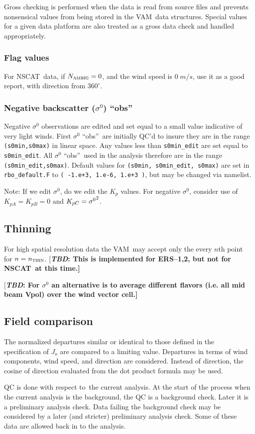 \documentclass[11pt]{article}
\newcommand{\computer}[1]{{\tt #1}}
\newcommand{\degrees}[1]{\mbox{$ {#1}^\circ $}}
\newcommand{\ers}[1]{ERS--{#1}}
\newcommand{\J}[1]{\mbox{$ J_{#1} $}}
\newcommand{\K}[1]{\mbox{$ K_{#1} $}}
\newcommand{\mks}[2]{\mbox{$ {#1} \; {#2} $}}
\newcommand{\nscat}{NSCAT}
\newcommand{\obs}{``obs''}
\newcommand{\s}[1]{\mbox{$ \sigma^{#1} $}}
\newcommand{\vam}{VAM}
\newcommand{\wrt}{with respect to}
\newcommand{\xxx}[1]{\subsection {#1}}
\newcommand{\xxxx}[1]{\subsubsection {#1}}
\newcommand{\TBD}[1]{{[\bfseries{\itshape{TBD: }{{#1}}}]}}
\newcommand{\COMMENT}[2]{{[\bfseries {\itshape #1}: {#2}]}}
\renewcommand{\TBD}[1]{\COMMENT{TBD}{{#1}}}
\newcommand{\subsc}[2]{\mbox{$ #1_{\mbox{\sc \footnotesize #2}} $}}
\begin{document}
Gross checking is performed when the data is read from source
files and prevents nonsensical values from being stored in the \vam\
data structures.  Special values for a given data platform are
also treated as a gross data check and handled appropriately.

\xxxx {Flag values}

For \nscat\ data, if $\subsc{N}{ambig} = 0$, and the wind speed is
\mks{0}{m/s}, use it as a good report, with direction from
\degrees{360}.

\xxxx {Negative backscatter (\s0) \obs}

Negative \s0 observations are edited and set equal to a small value
indicative of very light winds.  First \s0 \obs\ are initially QC'd to
insure they are in the range \computer{(s0min,s0max)} in linear space.
Any values less than \computer{s0min\_edit} are set equal to
\computer{s0min\_edit}.  All \s0 \obs\ used in the analysis therefore
are in the range \computer{(s0min\_edit,s0max)}.  Default values for
\computer{(s0min, s0min\_edit, s0max)} are set in
\computer{rbo\_default.F} to \computer{( -1.e+3, 1.e-6, 1.e+3 )}, but
may be changed via namelist.

Note: If we edit \s0, do we edit the \K{p} values.  For negative \s0,
consider use of $ K_{pA}=K_{pB}=0 $ and $ K_{pC} = \s0^2$.

\xxx {Thinning}

For high spatial resolution data the \vam\ may accept only the every
$n$th point for $ n = \subsc{n}{thin}$.
 \TBD{This is implemented for \ers1,2, but not for \nscat\ at this time.}

 \TBD{For \s0 an alternative is to average different flavors (i.e. all
mid beam Vpol) over the wind vector cell.}

\xxx {Field comparison}

The normalized departures similar or identical to those defined in the
specification of \J{o} are compared to a limiting value.  Departures
in terms of wind components, wind speed, and direction are
considered.  Instead of direction, the cosine of direction evaluated
from the dot product formula may be used.

QC is done \wrt\ the current analysis.  At the start of the process
when the current analysis is the background, the QC is a background
check.  Later it is a preliminary analysis check.  Data failing the
background check may be considered by a later (and stricter)
preliminary analysis check.  Some of these data are allowed back in to
the analysis.
\end{document}
